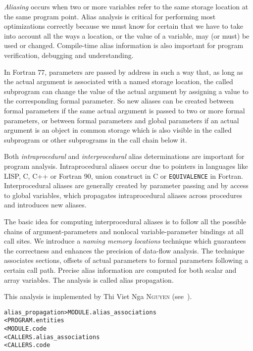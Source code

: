 \documentclass[a4paper]{report}
\newenvironment{PipsMake}{\begin{alltt}}{\end{alltt}}
\newenvironment{PipsPass}[1]{\label{pass:#1}}{}
\begin{document}
\begin{PipsPass}{alias_propagation}

\textit {Aliasing} occurs when two or more variables refer to the same
storage location at the same program point. Alias analysis is critical for
performing most optimizations correctly because we must know for certain
that we have to take into account
all the ways a location, or the value of a variable, may (or must)
be used or changed. Compile-time alias information is also important for
program verification, debugging and understanding.

In Fortran 77, parameters are passed by address in such
a way that, as long as the actual argument is associated with a named
storage location, the called subprogram can change the value of the actual
argument by assigning a value to the corresponding formal parameter. So
new aliases can be created between formal parameters if the
same actual argument is passed to two or more formal parameters, or between formal
parameters and global parameters if an actual
argument is an object in common storage which is also visible in the
called subprogram or other subprograms in the call chain below it.

Both \textit{intraprocedural} and \textit{interprocedural} alias
determinations are important for program analysis. Intraprocedural aliases
occur due to pointers in languages like LISP, C, C++ or Fortran 90,
union construct in C or \verb+EQUIVALENCE+ in Fortran. Interprocedural aliases
are generally created by parameter passing and by access to global
variables, which propagates intraprocedural aliases  across procedures and
introduces new aliases.

The basic idea for computing interprocedural aliases is to follow all the
possible chains of argument-parameters and nonlocal variable-parameter
bindings at all call sites. We introduce a \textit{naming memory
  locations} technique which guarantees the correctness and enhances the
precision of data-flow analysis. The technique associates sections,
offsets of actual parameters to formal parameters following a certain call
path. Precise alias information are computed for both scalar and array
variables. The analysis is called alias propagation.

This analysis is implemented by Thi Viet Nga \textsc{Nguyen} (see~\cite{Ngu02}).
\end{PipsPass}

\begin{PipsMake}

alias_propagation           > MODULE.alias_associations
        < PROGRAM.entities
        < MODULE.code
        < CALLERS.alias_associations
        < CALLERS.code

\end{PipsMake}
\end{document}
